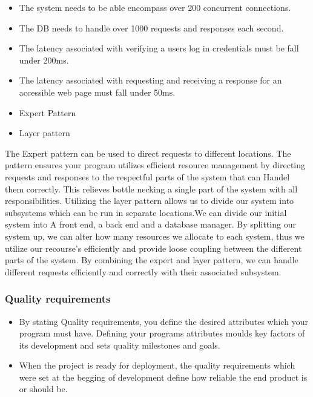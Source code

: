 \documentclass[a4paper,12pt]{article}
\begin{document}
	\textbf{ }
	\begin{itemize}
		\item The system needs to be able encompass over 200 concurrent connections.
		
		\item The DB needs to handle over 1000 requests and responses each second.
		
		\item The latency associated with verifying a users log in credentials must be fall under 200ms. 
		
		\item The latency associated with requesting and receiving a response for an accessible web page must fall under 50ms.
	\end{itemize}
	\textbf{}
	\begin{itemize}
		\item Expert Pattern
		\item Layer pattern
	\end{itemize}
	
	\begin{flushleft}
		The Expert pattern can be used to direct requests to different locations. The pattern ensures your program utilizes efficient resource management by directing requests and responses to the respectful parts of the system that can Handel them correctly. This relieves bottle necking a single part of the system with all responsibilities.
		\linebreak
		Utilizing the layer pattern allows us to divide our system into subsystems which can be run in separate locations.We can divide our initial system into A front end, a back end and a database manager. By splitting our system up, we can alter how many resources we allocate to each system, thus we utilize our recourse's efficiently and provide loose coupling between the different parts of the system. 
		\linebreak
		By combining the expert and layer pattern, we can handle different requests efficiently and correctly with their associated subsystem. 
	\end{flushleft}
	
	\subsubsection{Quality requirements}
	\textbf{  }
	\begin{itemize}
		\item By stating Quality requirements, you define the desired attributes which your program must have. Defining your programs attributes moulds key factors of its development and sets quality milestones and goals.  
		
		\item When the project is ready for deployment, the quality requirements which were set at the begging of development define how reliable the end product is or should be.
	\end{itemize}
	
\end{document}

